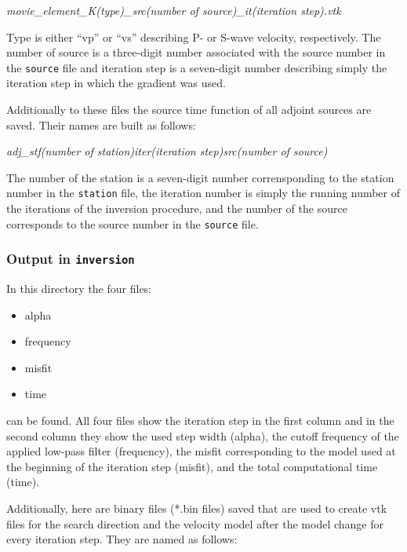			\begin{center}%
				\emph{movie\_element\_K(type)\_src(number of source)\_it(iteration step).vtk}
			\end{center}
			
			Type is either ``vp'' or ``vs'' describing P- or S-wave velocity, respectively. The number of source is a three-digit number associated with the source number in the \texttt{source} file and iteration step is a seven-digit number describing simply the iteration step in which the gradient was used. 
			
			Additionally to these files the source time function of all adjoint sources are saved. Their names are built as follows:
			\begin{center}%
				\emph{adj\_stf(number of station)iter(iteration step)src(number of source)}
			\end{center}
			
			The number of the station is a seven-digit number corrensponding to the station number in the \texttt{station} file, the iteration number is simply the running number of the iterations of the inversion procedure, and the number of the source corresponds to the source number in the \texttt{source} file. 
		\subsubsection{Output in \texttt{inversion}}
			In this directory the four files:
			
			\begin{itemize}
				\item alpha
				\item frequency
				\item misfit
				\item time
			\end{itemize}						
			
			can be found. All four files show the iteration step in the first column and in the second column they show the used step width (alpha), the cutoff frequency of the applied low-pass filter (frequency), the misfit corresponding to the model used at the beginning of the iteration step (misfit), and the total computational time (time).
			
			\medskip
			Additionally, here are binary files (*.bin files)  saved that are used to create vtk files for the search direction and the velocity model after the model change for every iteration step. They are named as follows: 
			
